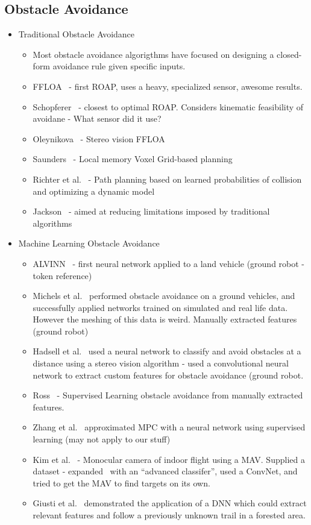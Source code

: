\documentclass[paper=a4, fontsize=11pt]{scrartcl} %
\begin{document}
	\subsection{Obstacle Avoidance}
		\begin{itemize}
			\item Traditional Obstacle Avoidance
			\begin{itemize}
				\item Most obstacle avoidance algorigthms have focused on designing a closed-form avoidance rule given specific inputs.
				\item FFLOA~\cite{Scherer2007} - first ROAP, uses a heavy, specialized sensor, awesome results.
				\item Schopferer~\cite{Schopferer2014} - closest to optimal ROAP.  Considers kinematic feasibility of avoidane - What sensor did it use?
				\item Oleynikova~\cite{Oleynikova2015} - Stereo vision FFLOA
				\item Saunders~\cite{Saunders2009} - Local memory Voxel Grid-based planning
				\item Richter et al.~\cite{Richter2014} - Path planning based on learned probabilities of collision and optimizing a dynamic model
				\item Jackson~\cite{CEPA} - aimed at reducing limitations imposed by traditional algorithms
			\end{itemize}
			\item Machine Learning Obstacle Avoidance
			\begin{itemize}			
				\item ALVINN~\cite{Pomerleau1989} - first neural network applied to a land vehicle (ground robot - token reference)
				\item Michels et al.~\cite{Michels2005} performed obstacle avoidance on a ground vehicles, and successfully applied networks trained on simulated and real life data.  However the meshing of this data is weird.  Manually extracted features (ground robot)
				\item Hadsell et al.~\cite{Hadsell2009} used a neural network to classify and avoid obstacles at a distance using a stereo vision algorithm - used a convolutional neural network to extract custom features for obstacle avoidance (ground robot.
				\item Ross~\cite{Ross2013} - Supervised Learning obstacle avoidance from manually extracted features.
				\item Zhang et al.~\cite{Zhang2015} approximated MPC with a neural network using supervised learning (may not apply to our stuff)
				\item Kim et al.~\cite{Kim2015} - Monocular camera of indoor flight using a MAV.  Supplied a dataset - expanded~\cite{Ross2013} with an ``advanced classifer'', used a ConvNet, and tried to get the MAV to find targets on its own.
				\item Giusti et al.~\cite{Guisti2016} demonstrated the application of a DNN which could extract relevant features and follow a previously unknown trail in a forested area.
			\end{itemize}
		\end{itemize}
\end{document}

